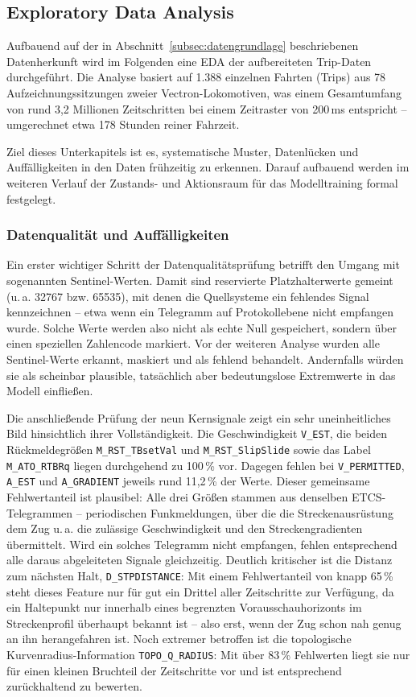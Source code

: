 \subsection{Exploratory Data Analysis}
\label{subsec:eda}

Aufbauend auf der in Abschnitt~\ref{subsec:datengrundlage} beschriebenen Datenherkunft wird im Folgenden eine \gls{EDA} der aufbereiteten Trip-Daten durchgeführt. Die Analyse basiert auf 1{.}388 einzelnen Fahrten (Trips) aus 78 Aufzeichnungssitzungen zweier Vectron-Lokomotiven, was einem Gesamtumfang von rund 3{,}2 Millionen Zeitschritten bei einem Zeitraster von 200\,ms entspricht -- umgerechnet etwa 178 Stunden reiner Fahrzeit.

Ziel dieses Unterkapitels ist es, systematische Muster, Datenlücken und Auffälligkeiten in den Daten frühzeitig zu erkennen. Darauf aufbauend werden im weiteren Verlauf der Zustands- und Aktionsraum für das Modelltraining formal festgelegt.
\subsubsection{Datenqualität und Auffälligkeiten}
\label{subsubsec:datenqualitaet}

Ein erster wichtiger Schritt der Datenqualitätsprüfung betrifft den Umgang mit sogenannten Sentinel-Werten. Damit sind reservierte Platzhalterwerte gemeint (u.\,a. 32767 bzw. 65535), mit denen die Quellsysteme ein fehlendes Signal kennzeichnen -- etwa wenn ein Telegramm auf Protokollebene nicht empfangen wurde. Solche Werte werden also nicht als echte Null gespeichert, sondern über einen speziellen Zahlencode markiert. Vor der weiteren Analyse wurden alle Sentinel-Werte erkannt, maskiert und als fehlend behandelt. Andernfalls würden sie als scheinbar plausible, tatsächlich aber bedeutungslose Extremwerte in das Modell einfließen.

Die anschließende Prüfung der neun Kernsignale zeigt ein sehr uneinheitliches Bild hinsichtlich ihrer Vollständigkeit. Die Geschwindigkeit \texttt{V\_EST}, die beiden Rückmeldegrößen \texttt{M\_RST\_TBsetVal} und \texttt{M\_RST\_SlipSlide} sowie das Label \texttt{M\_ATO\_RTBRq} liegen durchgehend zu 100\,\% vor. Dagegen fehlen bei \texttt{V\_PERMITTED}, \texttt{A\_EST} und \texttt{A\_GRADIENT} jeweils rund 11{,}2\,\% der Werte. Dieser gemeinsame Fehlwertanteil ist plausibel: Alle drei Größen stammen aus denselben \gls{ETCS}-Telegrammen -- periodischen Funkmeldungen, über die die Streckenausrüstung dem Zug u.\,a. die zulässige Geschwindigkeit und den Streckengradienten übermittelt. Wird ein solches Telegramm nicht empfangen, fehlen entsprechend alle daraus abgeleiteten Signale gleichzeitig. Deutlich kritischer ist die Distanz zum nächsten Halt, \texttt{D\_STPDISTANCE}: Mit einem Fehlwertanteil von knapp 65\,\% steht dieses Feature nur für gut ein Drittel aller Zeitschritte zur Verfügung, da ein Haltepunkt nur innerhalb eines begrenzten Vorausschauhorizonts im Streckenprofil überhaupt bekannt ist -- also erst, wenn der Zug schon nah genug an ihn herangefahren ist. Noch extremer betroffen ist die topologische Kurvenradius-Information \texttt{TOPO\_Q\_RADIUS}: Mit über 83\,\% Fehlwerten liegt sie nur für einen kleinen Bruchteil der Zeitschritte vor und ist entsprechend zurückhaltend zu bewerten.

